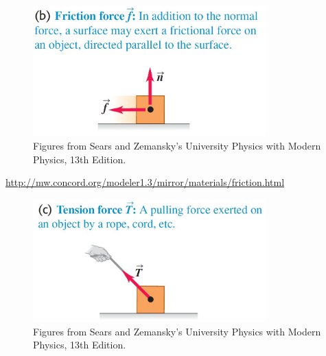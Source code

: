 \documentclass[]{beamer}
\begin{document}


\begin{frame}

    \begin{figure}[h!]  
        \includegraphics[width=0.8\textwidth]{images/f2.jpg}
        \caption{ {\tiny Figures from Sears and Zemansky's University Physics 
        with Modern Physics, 13th Edition.} }
      \end{figure}
  

\url{http://mw.concord.org/modeler1.3/mirror/materials/friction.html}
    


    
    \end{frame}




\begin{frame}

  \begin{figure}[h!]  
      \includegraphics[width=0.8\textwidth]{images/f3.jpg}
      \caption{ {\tiny Figures from Sears and Zemansky's University Physics 
      with Modern Physics, 13th Edition.} }
    \end{figure}



  
  
  \end{frame}
\end{document}

